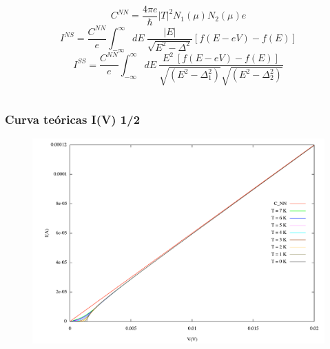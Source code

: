 \begin{frame}
\begin{columns}
\begin{column}{0.7\textwidth}
\begin{flushleft}
\begin{equation*}
		C^{NN} = \frac{4\pi e}{\hbar} |T|^2 N_1(\mu)N_2(\mu) e
	\end{equation*}
\vspace{0.4cm}
	\begin{equation*}\label{ins}
		I^{NS} = \frac{C^{NN}}{e} \int_{-\infty}^{\infty} dE\ \frac{|E|}{\sqrt{E^2-\Delta^2}} [f(E-eV)-f(E)]
	\end{equation*}
\vspace{0.4cm}	
	\begin{equation*}\label{iss}
		I^{SS} = \frac{C^{NN}}{e} \int_{-\infty}^{\infty} dE\ 
		\frac{E^2\ [f(E-eV)-f(E)]}{\sqrt{(E^2-\Delta_1 ^2)}\sqrt{(E^2-\Delta_2 ^2)}}
	\end{equation*}
\end{flushleft}
\end{column}
\end{columns}

\end{frame}
\begin{frame}
\frametitle{Curva te\'oricas I(V) 1/2}

\begin{figure}[!h] \label{iv_teorico}
\includegraphics[width=\textwidth]{iv_teorico}
\end{figure}
	
\end{frame}
